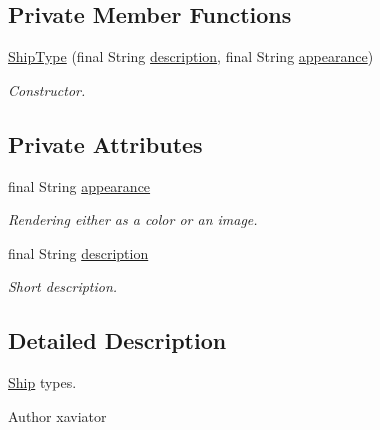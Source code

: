 \subsection*{Private Member Functions}
\begin{DoxyCompactItemize}
\item 
\hyperlink{enumbattleship2D_1_1model_1_1ShipType_af75a4ecff25c2d6fd086c0f9e443d8ab}{Ship\-Type} (final String \hyperlink{enumbattleship2D_1_1model_1_1ShipType_a99b2dcefbf9c3c0c210d2f7760d247ef}{description}, final String \hyperlink{enumbattleship2D_1_1model_1_1ShipType_a003ee9ae1371b0c5ad31c39d2653b850}{appearance})
\begin{DoxyCompactList}\small\item\em Constructor. \end{DoxyCompactList}\end{DoxyCompactItemize}
\subsection*{Private Attributes}
\begin{DoxyCompactItemize}
\item 
final String \hyperlink{enumbattleship2D_1_1model_1_1ShipType_a003ee9ae1371b0c5ad31c39d2653b850}{appearance}
\begin{DoxyCompactList}\small\item\em Rendering either as a color or an image. \end{DoxyCompactList}\item 
final String \hyperlink{enumbattleship2D_1_1model_1_1ShipType_a99b2dcefbf9c3c0c210d2f7760d247ef}{description}
\begin{DoxyCompactList}\small\item\em Short description. \end{DoxyCompactList}\end{DoxyCompactItemize}


\subsection{Detailed Description}
\hyperlink{classbattleship2D_1_1model_1_1Ship}{Ship} types. 

\begin{DoxyAuthor}{Author}
xaviator 
\end{DoxyAuthor}


